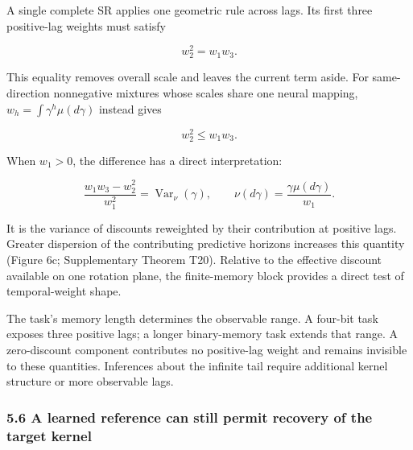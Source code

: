 \documentclass[11pt,a4paper]{article}
\begin{document}
\par
\noindent\begin{minipage}{\linewidth}

A single complete SR applies one geometric rule across lags. Its first
three positive-lag weights must satisfy

\[
w_2^2=w_1w_3.
\]

\end{minipage}\par

\par
\noindent\begin{minipage}{\linewidth}

This equality removes overall scale and leaves the current term aside.
For same-direction nonnegative mixtures whose scales share one neural
mapping, \(w_h=\int\gamma^h\mu(d\gamma)\) instead gives

\[
w_2^2\leq w_1w_3.
\]

\end{minipage}\par

\par
\noindent\begin{minipage}{\linewidth}

When \(w_1>0\), the difference has a direct interpretation:

\[
\frac{w_1w_3-w_2^2}{w_1^2}
=\operatorname{Var}_{\nu}(\gamma),
\qquad\nu(d\gamma)=\frac{\gamma\mu(d\gamma)}{w_1}.
\]

\end{minipage}\par

It is the variance of discounts reweighted by their contribution at
positive lags. Greater dispersion of the contributing predictive
horizons increases this quantity (Figure 6c; Supplementary Theorem T20).
Relative to the effective discount available on one rotation plane, the
finite-memory block provides a direct test of temporal-weight shape.

The task's memory length determines the observable range. A four-bit
task exposes three positive lags; a longer binary-memory task extends
that range. A zero-discount component contributes no positive-lag weight
and remains invisible to these quantities. Inferences about the infinite
tail require additional kernel structure or more observable lags.

\subsubsection{5.6 A learned reference can still permit recovery of the
target
kernel}\label{a-learned-reference-can-still-permit-recovery-of-the-target-kernel}
\end{document}
